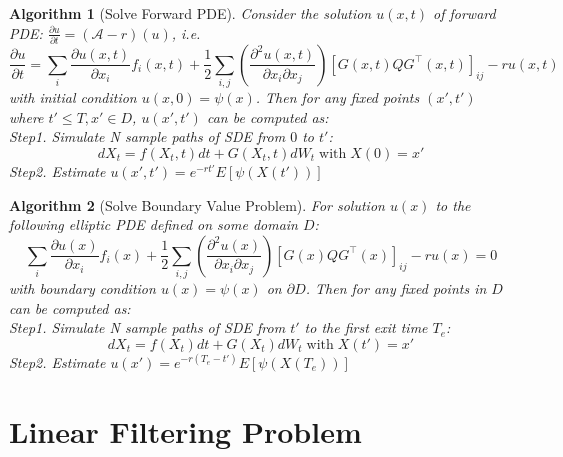 \documentclass{article}
\newtheorem{algorithm}{Algorithm}
\begin{document}
\begin{algorithm}[Solve Forward PDE]
    Consider the solution $u(x, t)$ of forward PDE: $\frac{\partial u}{\partial t}=(\mathcal{A}-r)(u)$, i.e.
    \begin{equation}
        \frac{\partial u}{\partial t}=\sum_{i} \frac{\partial u(x, t)}{\partial x_{i}} f_{i}(x, t)+\frac{1}{2} \sum_{i, j}\left(\frac{\partial^{2}u(x, t)}{\partial x_{i} \partial x_{j}}\right)\left[G(x, t) Q G^{\top}(x, t)\right]_{i j} - ru(x, t)
    \end{equation}
    with initial condition $u(x, 0)=\psi(x)$. Then for any fixed points $(x', t')$ where $t'\leq T, x'\in D$, $u(x', t')$ can be computed as:\\
    Step1. Simulate N sample paths of SDE from $0$ to $t'$:
    \begin{equation}
        dX_t=f(X_t, t)dt + G(X_t, t)dW_t\operatorname{with}X(0)=x'
    \end{equation}
    Step2. Estimate $u(x', t') = e^{-rt'}E\left[\psi(X(t'))\right]$
\end{algorithm}
\begin{algorithm}[Solve Boundary Value Problem]
    For solution $u(x)$ to the following elliptic PDE defined on some domain $D$:
    \begin{equation}
        \sum_{i} \frac{\partial u(x)}{\partial x_{i}} f_{i}(x)+\frac{1}{2} \sum_{i, j}\left(\frac{\partial^{2}u(x)}{\partial x_{i} \partial x_{j}}\right)\left[G(x) Q G^{\top}(x)\right]_{i j} - ru(x)=0
    \end{equation}
    with boundary condition $u(x)=\psi(x)$ on $\partial D$. Then for any fixed points in $D$ can be computed as:\\
    Step1. Simulate N sample paths of SDE from $t'$ to the first exit time $T_e$:
    \begin{equation}
        dX_t=f(X_t)dt + G(X_t)dW_t\operatorname{with}X(t')=x'
    \end{equation}
    Step2. Estimate $u(x') = e^{-r(T_e-t')}E\left[\psi(X(T_e))\right]$
\end{algorithm}

\section{Linear Filtering Problem}
\end{document}
